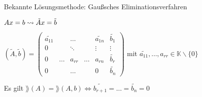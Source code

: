 Bekannte Lösungsmethode: Gaußsches Eliminationsverfahren

$Ax=b \rightsquigarrow \tilde{A}x = \tilde{b} \\$

\(
(\tilde{A},\tilde{b})=
\begin{pmatrix}
\tilde{a_{11}} & &\dots  &  & \tilde{a_{1n}} & \tilde{b_1} \\
0 & & \ddots &  & \vdots & \vdots \\
0 & \dots & a_{rr} & \dots & a_{rn} & \tilde{b_r} \\
0 & & \dots & & 0 & \tilde{b_n} \end{pmatrix}
\)
mit $\tilde{a_{11}}, \dots, a_{rr} \in \mathbb{K} \backslash \{0\} $

Es gilt $\rang(A)= \rang(A,b) \Leftrightarrow
\tilde{b_{r+1}} = \dots = \tilde{b_n} = 0$

